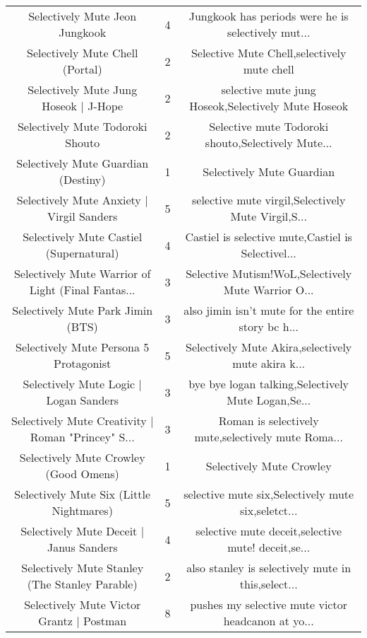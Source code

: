 \begin{table}[h!]
{\begin{tabular}{|c|c|c|}
                    Selectively Mute Jeon Jungkook &      4 & Jungkook has periods were he is selectively mut... \\
                   Selectively Mute Chell (Portal) &      2 &        Selective Mute Chell,selectively mute chell \\
             Selectively Mute Jung Hoseok | J-Hope &      2 & selective mute jung Hoseok,Selectively Mute Hoseok \\
                  Selectively Mute Todoroki Shouto &      2 & Selective mute Todoroki shouto,Selectively Mute... \\
               Selectively Mute Guardian (Destiny) &      1 &                          Selectively Mute Guardian \\
         Selectively Mute Anxiety | Virgil Sanders &      5 & selective mute virgil,Selectively Mute Virgil,S... \\
           Selectively Mute Castiel (Supernatural) &      4 & Castiel is selective mute,Castiel is Selectivel... \\
Selectively Mute Warrior of Light (Final Fantas... &      3 & Selective Mutism!WoL,Selectively Mute Warrior O... \\
                 Selectively Mute Park Jimin (BTS) &      3 & also jimin isn't mute for the entire story bc h... \\
            Selectively Mute Persona 5 Protagonist &      5 & Selectively Mute Akira,selectively mute akira k... \\
            Selectively Mute Logic | Logan Sanders &      3 & bye bye logan talking,Selectively Mute Logan,Se... \\
Selectively Mute Creativity | Roman "Princey" S... &      3 & Roman is selectively mute,selectively mute Roma... \\
             Selectively Mute Crowley (Good Omens) &      1 &                           Selectively Mute Crowley \\
          Selectively Mute Six (Little Nightmares) &      5 & selective mute six,Selectively mute six,seletct... \\
           Selectively Mute Deceit | Janus Sanders &      4 & selective mute deceit,selective mute! deceit,se... \\
    Selectively Mute Stanley (The Stanley Parable) &      2 & also stanley is selectively mute in this,select... \\
          Selectively Mute Victor Grantz | Postman &      8 & pushes my selective mute victor headcanon at yo... \\

\end{tabular}}
\end{table}
